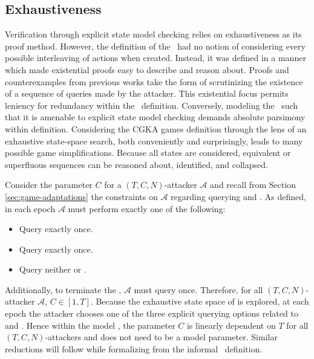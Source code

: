 \hypertarget{sec:exhaustiveness}{%
\subsection{Exhaustiveness}\label{sec:exhaustiveness}}

Verification through explicit state model checking relies on exhaustiveness as its proof method.
However, the definition of the \CGKAsec\ had no notion of considering every possible interleaving of actions when created.
Instead, it was defined in a manner which made existential proofs easy to describe and reason about.
Proofs and counterexamples from previous works \autocite{alwen2019double, alwen2020security} take the form of scrutinizing the existence of a sequence of queries made by the attacker.
This existential focus permits leniency for redundancy within the \CGKAsec\ definition.
Conversely, modeling the \CGKAsec\ such that it is amenable to explicit state model checking demands absolute parsimony within definition.
Considering the CGKA games definition through the lens of an exhaustive state-space search, both conveniently and surprisingly, leads to many possible game simplifications.
Because all states are considered, equivalent or superfluous sequences can be reasoned about, identified, and collapsed.

Consider the parameter \(C\) for a \((T, C, N)\)-attacker \(\mathcal{A}\) and recall from Section \ref{sec:game-adaptations} the constraints on \(\mathcal{A}\) regarding querying  and .
As defined, in each epoch \(\mathcal{A}\) must perform exactly one of the following:

\begin{itemize}
  \item Query  exactly once.
  \item Query   exactly once.
  \item Query neither  or .
\end{itemize}

Additionally, to terminate the \CGKAsec, \(\mathcal{A}\) must query  once.
Therefore, for all \((T, C, N)\)-attacker \(\mathcal{A}\), \(C \in [1, T]\).
Because the exhaustive state space of is explored, at each epoch the attacker chooses one of the three explicit querying options related to  and .
Hence within the model , the parameter \(C\) is linearly dependent on \(T\) for all \((T, C, N)\)-attackers and does not need to be a model parameter.
Similar reductions will follow while formalizing  from the informal \CGKAsec\ definition.


